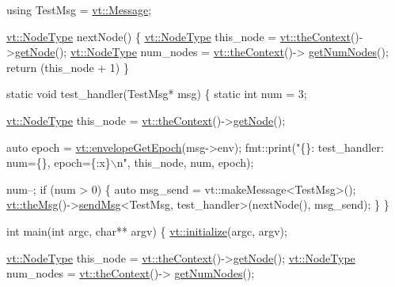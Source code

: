 \begin{DoxyCodeInclude}
\textcolor{keyword}{using} TestMsg = \hyperlink{namespacevt_a3a3ddfef40b4c90915fa43cdd5f129ea}{vt::Message};

\hyperlink{namespacevt_a866da9d0efc19c0a1ce79e9e492f47e2}{vt::NodeType} nextNode() \{
  \hyperlink{namespacevt_a866da9d0efc19c0a1ce79e9e492f47e2}{vt::NodeType} this\_node = \hyperlink{namespacevt_a26551fe0e6e6a1371111df5b12c7e92c}{vt::theContext}()->\hyperlink{structvt_1_1ctx_1_1_context_a0d52c263ce8516546a67443d9a86fa5f}{getNode}();
  \hyperlink{namespacevt_a866da9d0efc19c0a1ce79e9e492f47e2}{vt::NodeType} num\_nodes = \hyperlink{namespacevt_a26551fe0e6e6a1371111df5b12c7e92c}{vt::theContext}()->
      \hyperlink{structvt_1_1ctx_1_1_context_a7f41071aadf6d5fa9e1b6c703c5ff19d}{getNumNodes}();
  \textcolor{keywordflow}{return} (this\_node + 1) %
\}

\textcolor{keyword}{static} \textcolor{keywordtype}{void} test\_handler(TestMsg* msg) \{
  \textcolor{keyword}{static} \textcolor{keywordtype}{int} num = 3;

  \hyperlink{namespacevt_a866da9d0efc19c0a1ce79e9e492f47e2}{vt::NodeType} this\_node = \hyperlink{namespacevt_a26551fe0e6e6a1371111df5b12c7e92c}{vt::theContext}()->\hyperlink{structvt_1_1ctx_1_1_context_a0d52c263ce8516546a67443d9a86fa5f}{getNode}();

  \textcolor{keyword}{auto} epoch = \hyperlink{namespacevt_ad5495e7900227550b44837e899c5bb13}{vt::envelopeGetEpoch}(msg->env);
  fmt::print(\textcolor{stringliteral}{"\{\}: test\_handler: num=\{\}, epoch=\{:x\}\(\backslash\)n"}, this\_node, num, epoch);

  num--;
  \textcolor{keywordflow}{if} (num > 0) \{
    \textcolor{keyword}{auto} msg\_send = vt::makeMessage<TestMsg>();
    \hyperlink{namespacevt_aeafd31f866aeb4dc6fc2f6ee97136350}{vt::theMsg}()->\hyperlink{group__preregister_ga0162a39473e7f9b490a79a7983d949ac}{sendMsg}<TestMsg, test\_handler>(nextNode(), msg\_send);
  \}
\}

\textcolor{keywordtype}{int} main(\textcolor{keywordtype}{int} argc, \textcolor{keywordtype}{char}** argv) \{
  \hyperlink{namespacevt_aaa266774ea8339c58be0202b00fafa62}{vt::initialize}(argc, argv);

  \hyperlink{namespacevt_a866da9d0efc19c0a1ce79e9e492f47e2}{vt::NodeType} this\_node = \hyperlink{namespacevt_a26551fe0e6e6a1371111df5b12c7e92c}{vt::theContext}()->\hyperlink{structvt_1_1ctx_1_1_context_a0d52c263ce8516546a67443d9a86fa5f}{getNode}();
  \hyperlink{namespacevt_a866da9d0efc19c0a1ce79e9e492f47e2}{vt::NodeType} num\_nodes = \hyperlink{namespacevt_a26551fe0e6e6a1371111df5b12c7e92c}{vt::theContext}()->
      \hyperlink{structvt_1_1ctx_1_1_context_a7f41071aadf6d5fa9e1b6c703c5ff19d}{getNumNodes}();


\end{DoxyCodeInclude}
